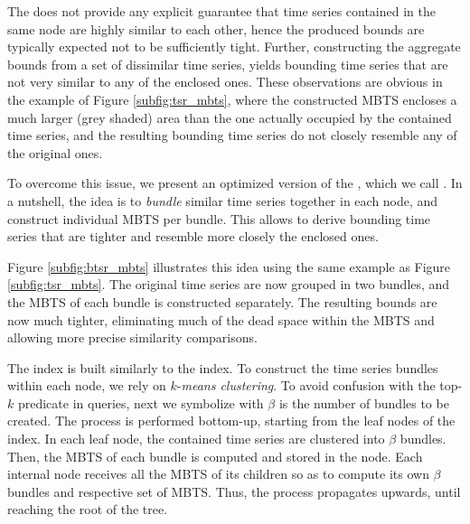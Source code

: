 The \tsr does not provide any explicit guarantee that time series contained in the same node are highly similar to each other, hence the produced bounds are typically expected not to be sufficiently tight. Further, constructing the aggregate bounds from a set of dissimilar time series, yields bounding time series that are not very similar to any of the enclosed ones. These observations are obvious in the example of Figure \ref{subfig:tsr_mbts}, where the constructed MBTS encloses a much larger (grey shaded) area than the one actually occupied by the contained time series, and the resulting bounding time series do not closely resemble any of the original ones.

To overcome this issue, we present an optimized version of the \tsr, which we call \ctsr. In a nutshell, the idea is to \emph{bundle} similar time series together in each node, and construct individual MBTS per bundle. This allows to derive bounding time series that are tighter and resemble more closely the enclosed ones. 


\begin{myexample}
 Figure \ref{subfig:btsr_mbts} illustrates this idea using the same example as Figure \ref{subfig:tsr_mbts}. The original time series are now grouped in two bundles, and the MBTS of each bundle is constructed separately. The resulting bounds are now much tighter, eliminating much of the dead space within the MBTS and allowing more precise similarity comparisons.
\end{myexample}


The \ctsr index is built similarly to the \tsr index. To construct the time series bundles within each node, we rely on $k$-{\em means clustering}. To avoid confusion with the top-$k$ predicate in queries, next we symbolize with $\beta$ is the number of bundles to be created. The process is performed bottom-up, starting from the leaf nodes of the index. In each leaf node, the contained time series are clustered into $\beta$ bundles. Then, the MBTS of each bundle is computed and stored in the node. Each internal node receives all the MBTS of its children so as to compute its own $\beta$ bundles and respective set of MBTS. Thus, the process propagates upwards, until reaching the root of the tree.

